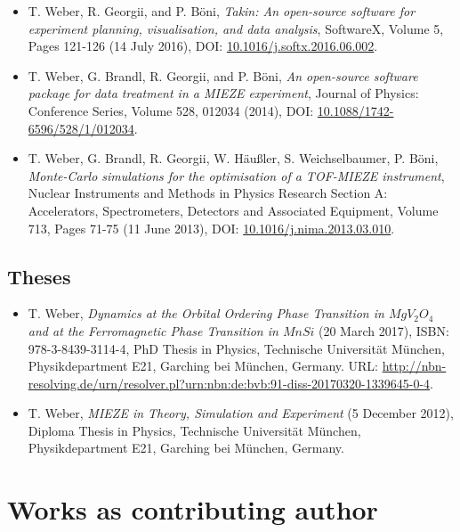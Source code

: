 \begin{itemize}
	\item T. Weber, R. Georgii, and P. B\"oni,
	\textit{Takin: An open-source software for experiment planning, visualisation, and data analysis},
	SoftwareX, Volume 5, Pages 121-126 (14 July 2016),
	DOI: \href{https://doi.org/10.1016/j.softx.2016.06.002}{10.1016/j.softx.2016.06.002}.

	\item T. Weber, G. Brandl, R. Georgii, and P. B\"oni,
	\textit{An open-source software package for data treatment in a MIEZE experiment},
	Journal of Physics: Conference Series, Volume 528, 012034 (2014),
	DOI: \href{https://doi.org/10.1088/1742-6596/528/1/012034}{10.1088/1742-6596/528/1/012034}.
	
	\item T. Weber, G. Brandl, R. Georgii, W. H\"au\ss{}ler, S. Weichselbaumer, P. B\"oni,
	\textit{Monte-Carlo simulations for the optimisation of a TOF-MIEZE instrument},
	Nuclear Instruments and Methods in Physics Research Section A: Accelerators, Spectrometers, Detectors and Associated Equipment, Volume 713, Pages 71-75 (11 June 2013),
	DOI: \href{https://doi.org/10.1016/j.nima.2013.03.010}{10.1016/j.nima.2013.03.010}.
\end{itemize}


\subsection*{Theses}
\begin{itemize}
	\item T. Weber, \textit{Dynamics at the Orbital Ordering Phase Transition in $MgV_2O_4$ and at the Ferromagnetic Phase Transition in $MnSi$} (20 March 2017), ISBN: 978-3-8439-3114-4,
	PhD Thesis in Physics, Technische Universit\"at M\"unchen, Physikdepartment E21,
	Garching bei M\"unchen, Germany. URL: \url{http://nbn-resolving.de/urn/resolver.pl?urn:nbn:de:bvb:91-diss-20170320-1339645-0-4}.

	\item T. Weber, \textit{MIEZE in Theory, Simulation and Experiment} (5 December 2012), 
	Diploma Thesis in Physics, Technische Universit\"at M\"unchen, Physikdepartment E21,
	Garching bei M\"unchen, Germany.
\end{itemize}



\section{Works as contributing author}

